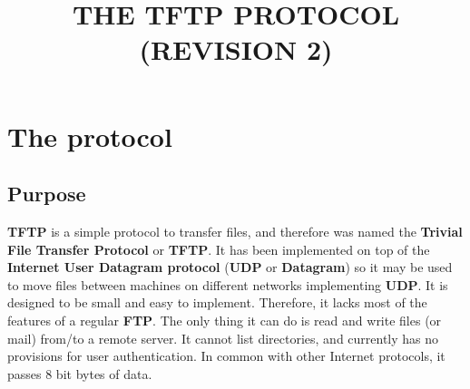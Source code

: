 \documentclass[12pt]{article}
\title{THE TFTP PROTOCOL (REVISION 2)}
\begin{document}
\maketitle
\clearpage
\tableofcontents
\clearpage

\section{The protocol}
\subsection{Purpose}
\textbf{TFTP} is a simple protocol to transfer files, and therefore was named the \textbf{Trivial File Transfer Protocol} or \textbf{TFTP}. It has been implemented on top of the \textbf{Internet User Datagram protocol} (\textbf{UDP} or \textbf{Datagram}) so it may be used to move files between machines on different networks implementing \textbf{UDP}. It is designed to be small and easy to implement. Therefore, it lacks most of the features of a regular \textbf{FTP}. The only thing it can do is read and write files (or mail) from/to a remote server. It cannot list directories, and currently has no provisions for user authentication. In common with other Internet protocols, it passes 8 bit bytes of data.
\end{document}
